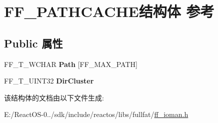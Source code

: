 \hypertarget{struct_f_f___p_a_t_h_c_a_c_h_e}{}\section{F\+F\+\_\+\+P\+A\+T\+H\+C\+A\+C\+H\+E结构体 参考}
\label{struct_f_f___p_a_t_h_c_a_c_h_e}
\subsection*{Public 属性}
\begin{DoxyCompactItemize}
\item 
\mbox{\label{struct_f_f___p_a_t_h_c_a_c_h_e_abadff449e7208bf9f0021b76527fe485}} 
F\+F\+\_\+\+T\+\_\+\+W\+C\+H\+AR {\bfseries Path} \mbox{[}F\+F\+\_\+\+M\+A\+X\+\_\+\+P\+A\+TH\mbox{]}
\item 
\mbox{\label{struct_f_f___p_a_t_h_c_a_c_h_e_aca8b3a8b78e2972b6967bff7c43eeee4}} 
F\+F\+\_\+\+T\+\_\+\+U\+I\+N\+T32 {\bfseries Dir\+Cluster}
\end{DoxyCompactItemize}


该结构体的文档由以下文件生成\+:\begin{DoxyCompactItemize}
\item 
E\+:/\+React\+O\+S-\/0../sdk/include/reactos/libs/fullfat/\hyperlink{ff__ioman_8h}{ff\+\_\+ioman.\+h}\end{DoxyCompactItemize}
